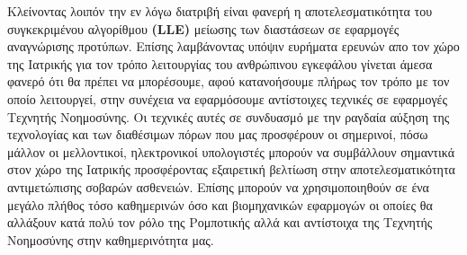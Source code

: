 Κλείνοντας λοιπόν την εν λόγω διατριβή είναι φανερή η αποτελεσματικότητα του συγκεκριμένου αλγορίθμου \textbf{(\textlatin{LLE})} μείωσης των διαστάσεων σε εφαρμογές αναγνώρισης προτύπων. Επίσης λαμβάνοντας υπόψιν ευρήματα ερευνών απο τον χώρο της Ιατρικής για τον τρόπο λειτουργίας του ανθρώπινου εγκεφάλου γίνεται άμεσα φανερό ότι θα πρέπει να μπορέσουμε, αφού κατανοήσουμε πλήρως τον τρόπο με τον οποίο λειτουργεί, στην συνέχεια να εφαρμόσουμε αντίστοιχες τεχνικές σε εφαρμογές Τεχνητής Νοημοσύνης. Οι τεχνικές αυτές σε συνδυασμό με την ραγδαία αύξηση της τεχνολογίας και των διαθέσιμων πόρων που μας προσφέρουν οι σημερινοί, πόσω μάλλον οι μελλοντικοί, ηλεκτρονικοί υπολογιστές μπορούν να συμβάλλουν σημαντικά στον χώρο της Ιατρικής προσφέροντας εξαιρετική βελτίωση στην αποτελεσματικότητα αντιμετώπισης σοβαρών ασθενειών. Επίσης μπορούν να χρησιμοποιηθούν σε ένα μεγάλο πλήθος τόσο καθημερινών όσο και βιομηχανικών εφαρμογών οι οποίες θα αλλάξουν κατά πολύ τον ρόλο της Ρομποτικής αλλά και αντίστοιχα της Τεχνητής Νοημοσύνης στην καθημερινότητα μας.
